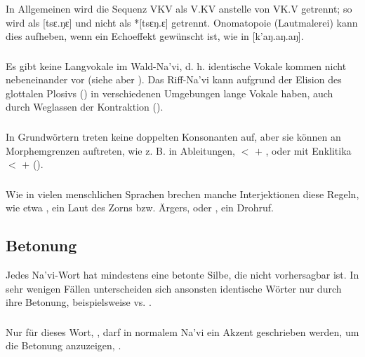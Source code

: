 \subsubsection{} In Allgemeinen wird die Sequenz VKV als V.KV anstelle von VK.V getrennt; so wird  als [tsɛ.ŋɛ] und nicht als *[tsɛŋ.ɛ] getrennt. Onomatopoie (Lautmalerei) kann dies aufheben, wenn ein Echoeffekt gewünscht ist, wie in  [k'aŋ.aŋ.aŋ].

\subsubsection{} Es gibt keine Langvokale im Wald-Na'vi, d. h. identische Vokale kommen nicht nebeneinander vor (siehe aber ). Das Riff-Na'vi kann aufgrund der Elision des glottalen Plosivs () in verschiedenen Umgebungen lange Vokale haben, auch durch Weglassen der Kontraktion ().

\subsubsection{} In Grundwörtern treten keine doppelten Konsonanten auf, aber sie können an Morphemgrenzen auftreten, wie z. B. in Ableitungen,  $<$  $+$ , oder mit Enklitika  $<$  $+$  ().

\subsubsection{} Wie in vielen menschlichen Sprachen brechen manche Interjektionen diese Regeln, wie etwa , ein Laut des Zorns bzw. Ärgers, oder , ein Drohruf.

\subsection{Betonung}
Jedes Na'vi-Wort hat mindestens eine betonte Silbe, die nicht vorhersagbar ist. In sehr wenigen Fällen unterscheiden sich ansonsten identische Wörter nur durch ihre Betonung, beispielsweise   vs.  .

\subsubsection{} Nur für dieses Wort, , darf in normalem Na'vi ein Akzent geschrieben werden, um die Betonung anzuzeigen, .

